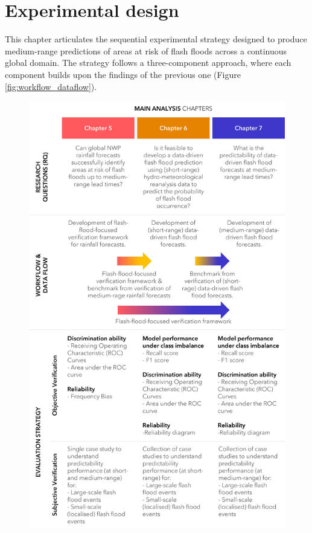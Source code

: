 \chapter{Experimental design}
\label{experimental_design}
\graphicspath{{chapter_03/figures}{chapter_03/tables}}


This chapter articulates the sequential experimental strategy designed to produce medium-range predictions of areas at risk of flash floods across a continuous global domain. The strategy follows a three-component approach, where each component builds upon the findings of the previous one (Figure \ref{fig:workflow_dataflow}). 

\begin{figure}[htbp]
\centering
\includegraphics[width=\textwidth]{workflow_dataflow.png}

\end{figure}
